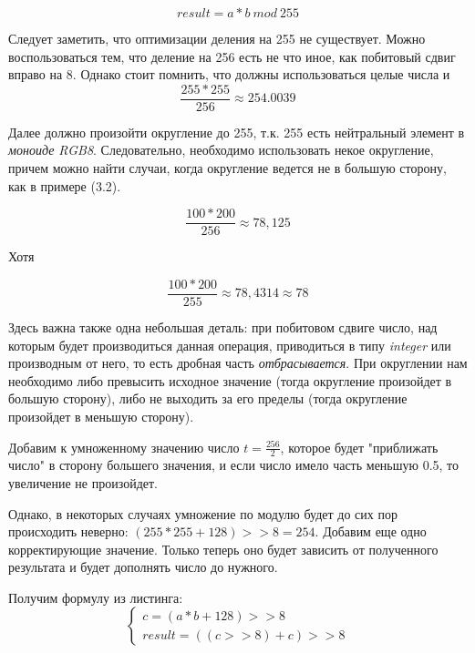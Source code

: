 \begin{equation}
result = a * b~mod~255
\end{equation}


Следует заметить, что оптимизации деления на 255 не существует. Можно воспользоваться тем, что деление на 256 есть не что иное, как побитовый сдвиг вправо на 8. Однако стоит помнить, что должны использоваться целые числа и 
\begin{equation}
\frac{255*255}{256} \approx 254.0039
\end{equation}

Далее должно произойти округление до 255, т.к. 255 есть нейтральный элемент в \textit{моноиде RGB8}.
Следовательно, необходимо использовать некое округление, причем можно найти случаи, когда округление ведется не в большую сторону, как в примере (3.2).

\begin{equation}
\frac{100*200}{256} \approx 78,125
\end{equation}

Хотя 

\begin{equation}
\frac{100*200}{255} \approx 78,4314 \approx 78
\end{equation}

Здесь важна также одна небольшая деталь: при побитовом сдвиге число, над которым будет производиться данная операция, приводиться в типу \textit{integer} или производным от него, то есть дробная часть \textit{отбрасывается}. При округлении нам необходимо либо превысить исходное значение (тогда округление произойдет в большую сторону), либо не выходить за его пределы (тогда округление произойдет в меньшую сторону). 

Добавим к умноженному значению число $t = \frac{256}{2}$, которое будет "приближать число" в сторону большего значения, и если число имело часть меньшую 0.5, то увеличение не произойдет.

Однако, в некоторых случаях умножение по модулю будет до сих пор происходить неверно: $(255*255+128) >> 8 = 254$. Добавим еще одно корректирующие значение. Только теперь оно будет зависить от полученного результата и будет дополнять число до нужного.

Получим формулу из листинга: 
\begin{equation}
\begin{cases} 
c = (a * b + 128) >> 8 \\
result = ((c >> 8) + c) >> 8
\end{cases}
\end{equation}

